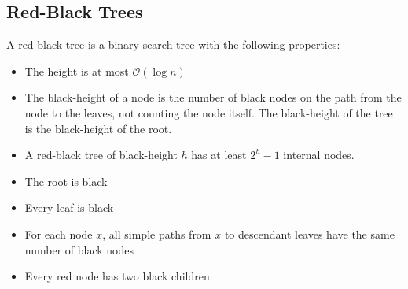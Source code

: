 \subsection{Red-Black Trees}
A red-black tree is a binary search tree with the following properties:
\begin{itemize}
    \item The height is at most \( \mathcal{O}(\log n) \)
    \item The black-height of a node is the number of black nodes on the path from the node to the leaves, not counting the node itself. The black-height of the tree is the black-height of the root.
    \item A red-black tree of black-height \( h \) has at least \( 2^h - 1 \) internal nodes. 
    \item The root is black
    \item Every leaf is black
    \item For each node \( x \), all simple paths from \( x \) to descendant leaves have the same number of black nodes
    \item Every red node has two black children
\end{itemize}

